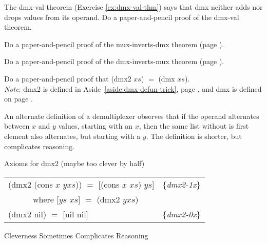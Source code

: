 \begin{ExerciseList}
\Exercise
The dmx-val theorem (Exercise \ref{ex:dmx-val-thm})
says that \textsf{dmx} neither adds nor drops values from its operand.
Do a paper-and-pencil proof of the dmx-val theorem.

\Exercise {}
Do a paper-and-pencil proof of the mux-inverts-dmx theorem
(page \pageref{thm:mux-inverts-dmx}).

\Exercise
Do a paper-and-pencil proof of the dmx-inverts-mux theorem
(page \pageref{thm:dmx-inverts-mux}).

\Exercise
\label{dmx2-eq-dmx}
Do a paper-and-pencil proof that
\textsf{(dmx2 $xs$)} $=$ \textsf{(dmx $xs$)}.\\
\emph{Note}: \textsf{dmx2} is defined in
Aside~\ref{aside:dmx-defun-trick}, page \pageref{aside:dmx-defun-trick},
and \textsf{dmx} is defined on page \pageref{dmx-defun}.

\end{ExerciseList}

\begin{aside}
An alternate definition of a demultiplexer
observes that if the operand alternates between $x$ and $y$ values,
starting with an $x$,
then the same list without is first element also alternates,
but starting with a $y$. The definition is shorter,
but complicates reasoning.\\
\begin{center}
Axioms for \textsf{dmx2} (maybe too clever by half)
\begin{tabular}{ll}
\textsf{(dmx2 (cons $x$ $yxs$)) $=$ [(cons $x$ $xs$) $ys$]}& \{\emph{dmx2-1x}\} \\
~~~~~~where \textsf{[$ys$ $xs$] $=$ (dmx2 $yxs$)}          & \\
\textsf{(dmx2 nil) $=$ [nil nil] }                         & \{\emph{dmx2-0x}\} \\
\end{tabular}
\end{center}
\caption{Cleverness Sometimes Complicates Reasoning}
\label{aside:dmx-defun-trick}
\end{aside} 